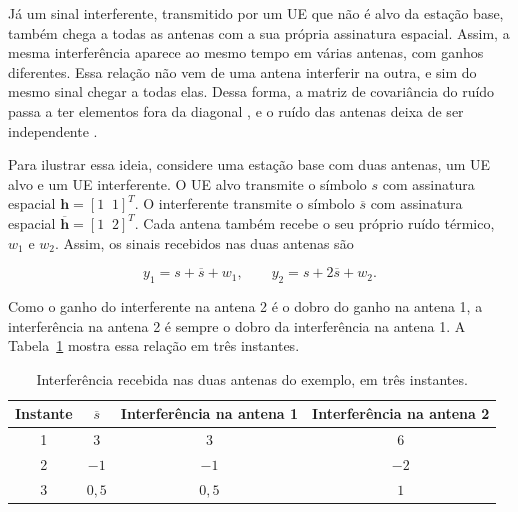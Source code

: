 Já um sinal interferente, transmitido por um UE que não é alvo da estação base, também chega a todas as antenas com a sua própria assinatura espacial. Assim, a mesma interferência aparece ao mesmo tempo em várias antenas, com ganhos diferentes. Essa relação não vem de uma antena interferir na outra, e sim do mesmo sinal chegar a todas elas. Dessa forma, a matriz de covariância do ruído passa a ter elementos fora da diagonal \cite[p.~360]{tse-viswanath}, e o ruído das antenas deixa de ser independente \cite[p.~202]{haykin-sistemas}.



Para ilustrar essa ideia, considere uma estação base com duas antenas, um UE alvo e um UE interferente. O UE alvo transmite o símbolo $s$ com assinatura espacial $\mathbf{h}=[1\;\;1]^T$. O interferente transmite o símbolo $\overline{s}$ com assinatura espacial $\overline{\mathbf{h}}=[1\;\;2]^T$. Cada antena também recebe o seu próprio ruído térmico, $w_1$ e $w_2$. Assim, os sinais recebidos nas duas antenas são

$$
y_1 = s + \overline{s} + w_1, \qquad y_2 = s + 2\overline{s} + w_2.
$$

Como o ganho do interferente na antena 2 é o dobro do ganho na antena 1, a interferência na antena 2 é sempre o dobro da interferência na antena 1. A Tabela~\ref{tab:interferencia_duas_antenas} mostra essa relação em três instantes.

\begin{table}[htbp]
\caption{Interferência recebida nas duas antenas do exemplo, em três instantes.}
\label{tab:interferencia_duas_antenas}
\centering
\begin{tabular}{cccc}
\hline
Instante & $\overline{s}$ & Interferência na antena 1 & Interferência na antena 2 \\
\hline
1 & $3$ & $3$ & $6$ \\
2 & $-1$ & $-1$ & $-2$ \\
3 & $0{,}5$ & $0{,}5$ & $1$ \\
\hline
\end{tabular}
\end{table}

